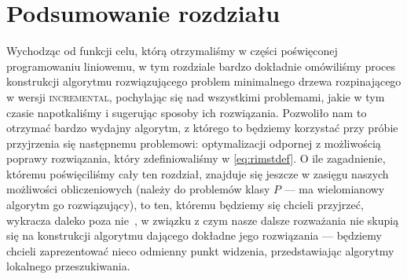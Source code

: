 \section{Podsumowanie rozdziału}

Wychodząc od funkcji celu, którą otrzymaliśmy w części poświęconej programowaniu liniowemu, w tym rozdziale bardzo dokładnie omówiliśmy proces konstrukcji algorytmu rozwiązującego problem minimalnego drzewa rozpinającego w wersji \textsc{incremental}, pochylając się nad wszystkimi problemami, jakie w tym czasie napotkaliśmy i sugerując sposoby ich rozwiązania. Pozwoliło nam to otrzymać bardzo wydajny algorytm, z którego to będziemy korzystać przy próbie przyjrzenia się następnemu problemowi: optymalizacji odpornej z możliwością poprawy rozwiązania, który zdefiniowaliśmy w \ref{eq:rimstdef}. O ile zagadnienie, któremu poświęciliśmy cały ten rozdział, znajduje się jeszcze w zasięgu naszych możliwości obliczeniowych (należy do problemów klasy $P$ --- ma wielomianowy algorytm go rozwiązujący), to ten, któremu będziemy się chcieli przyjrzeć, wykracza daleko poza nie~\cite{DBLP:journals/corr/NasrabadiO13}, w związku z czym nasze dalsze rozważania nie skupią się na konstrukcji algorytmu dającego dokładne jego rozwiązania --- będziemy chcieli zaprezentować nieco odmienny punkt widzenia, przedstawiając algorytmy lokalnego przeszukiwania.